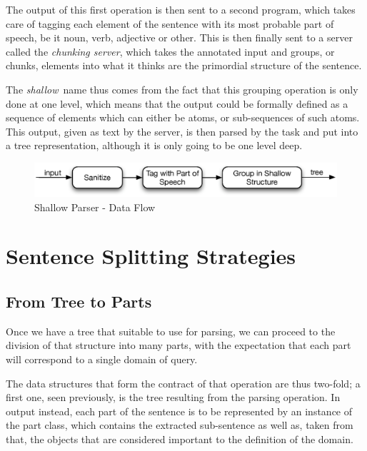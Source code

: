 The output of this first operation is then sent to a second program, which takes care of tagging each element of the sentence with its most probable part of speech, be it noun, verb, adjective or other. This is then finally sent to a server called the \emph{chunking server}, which takes the annotated input and groups, or chunks, elements into what it thinks are the primordial structure of the sentence.

The \emph{shallow}\ name thus comes from the fact that this grouping operation is only done at one level, which means that the output could be formally defined as a sequence of elements which can either be atoms, or sub-sequences of such atoms. This output, given as text by the server, is then parsed by the task and put into a tree representation, although it is only going to be one level deep.

\begin{figure}[ht!]
  \begin{center}
    \includegraphics[width=\linewidth]{images/shallowparserflow}
  \end{center}
  \caption{Shallow Parser - Data Flow}\label{fig:shallow_parser_flow}
\end{figure}



\section{Sentence Splitting Strategies} %
\label{sec:sentence_splitting_strategies}

\subsection{From Tree to Parts} %
\label{sub:from_tree_to_parts}

Once we have a tree that suitable to use for parsing, we can proceed to the division of that structure into many parts, with the expectation that each part will correspond to a single domain of query.

The data structures that form the contract of that operation are thus two-fold; a first one, seen previously, is the tree resulting from the parsing operation. In output instead, each part of the sentence is to be represented by an instance of the part class, which contains the extracted sub-sentence as well as, taken from that, the objects that are considered important to the definition of the domain.

